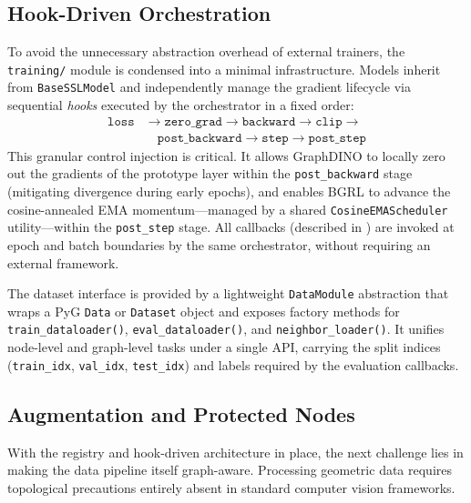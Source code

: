 \documentclass[conference]{IEEEtran}
\begin{document}
\subsection{Hook-Driven Orchestration}
To avoid the unnecessary abstraction overhead of external trainers, the \texttt{training/} module is condensed into a minimal infrastructure. Models inherit from \texttt{BaseSSLModel} and independently manage the gradient lifecycle via sequential \textit{hooks} executed by the orchestrator in a fixed order:
\begin{equation}
\begin{split}
\texttt{loss} &\rightarrow \texttt{zero\_grad} \rightarrow \texttt{backward} \rightarrow \texttt{clip} \rightarrow \\
&\quad \texttt{post\_backward} \rightarrow \texttt{step} \rightarrow \texttt{post\_step}
\end{split}
\end{equation}
This granular control injection is critical. It allows GraphDINO to locally zero out the gradients of the prototype layer within the \texttt{post\_backward} stage (mitigating divergence during early epochs), and enables BGRL to advance the cosine-annealed EMA momentum---managed by a shared \texttt{CosineEMAScheduler} utility---within the \texttt{post\_step} stage. All callbacks (described in ) are invoked at epoch and batch boundaries by the same orchestrator, without requiring an external framework.

The dataset interface is provided by a lightweight \texttt{DataModule} abstraction that wraps a PyG \texttt{Data} or \texttt{Dataset} object and exposes factory methods for \texttt{train\_dataloader()}, \texttt{eval\_dataloader()}, and \texttt{neighbor\_loader()}. It unifies node-level and graph-level tasks under a single API, carrying the split indices (\texttt{train\_idx}, \texttt{val\_idx}, \texttt{test\_idx}) and labels required by the evaluation callbacks.

\subsection{Augmentation and Protected Nodes}
\label{sec:augmentation}
With the registry and hook-driven architecture in place, the next challenge lies in making the data pipeline itself graph-aware. Processing geometric data requires topological precautions entirely absent in standard computer vision frameworks.
\end{document}
